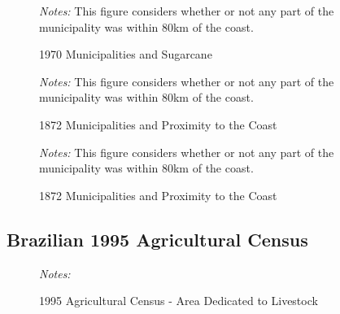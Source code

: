 \documentclass{article}
\begin{document}
\begin{figure}
  \caption{1970 Municipalities and Sugarcane}
  \begin{center}
  \textit{Notes:} This figure considers whether or not any part of the municipality was within 80km of the coast.
  \end{center}
  \label{fig:sugarcane_1970}
\end{figure}

\begin{figure}
  \caption{1872 Municipalities and Proximity to the Coast}
  \begin{center}
  \textit{Notes:} This figure considers whether or not any part of the municipality was within 80km of the coast.
  \end{center}
  \label{fig:cotton_1970}
\end{figure}

\begin{figure}
  \caption{1872 Municipalities and Proximity to the Coast}
  \begin{center}
  \textit{Notes:} This figure considers whether or not any part of the municipality was within 80km of the coast.
  \end{center}
  \label{fig:sugarcane_1970}
\end{figure}
\clearpage

\subsection*{Brazilian 1995 Agricultural Census}

\begin{figure}[h!]
  \caption{1995 Agricultural Census - Area Dedicated to Livestock}
  \begin{center}
  \textit{Notes:} 
  \end{center}
  \label{fig:livestock_area_1995}
\end{figure}
\clearpage
\end{document}
